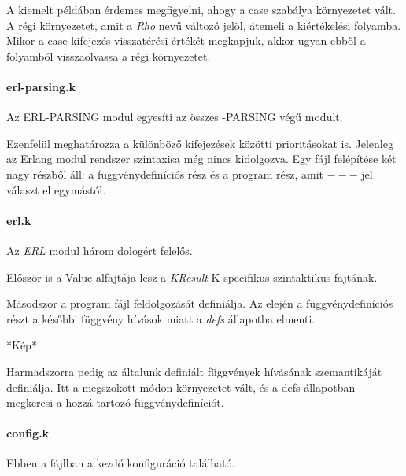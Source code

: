 

A kiemelt példában érdemes megfigyelni, ahogy a case szabálya környezetet vált. A régi környezetet, amit a \textit{Rho} nevű változó jelöl, átemeli a kiértékelési folyamba. Mikor a case kifejezés visszatérési értékét megkapjuk, akkor ugyan ebből a folyamból visszaolvassa a régi környezetet.

\paragraph{erl-parsing.k}

Az ERL-PARSING modul egyesíti az összes -PARSING végű modult.



Ezenfelül meghatározza a különböző kifejezések közötti prioritásokat is. Jelenleg az Erlang modul rendszer szintaxisa még nincs kidolgozva. Egy fájl felépítése két nagy részből áll: a függvénydefiníciós rész és a program rész, amit $---$ jel választ el egymástól.

\paragraph{erl.k}

Az \textit{ERL} modul három dologért felelős.



Először is a Value alfajtája lesz a \textit{KResult} K specifikus szintaktikus fajtának.



Másodszor a program fájl feldolgozását definiálja. Az elején a függvénydefiníciós részt a későbbi függvény hívások miatt a \textit{defs} állapotba elmenti.

*Kép*

Harmadszorra pedig az általunk definiált függvények hívásának szemantikáját definiálja. Itt a megszokott módon környezetet vált, és a defs állapotban megkeresi a hozzá tartozó függvénydefiníciót.


\paragraph{config.k}

Ebben a fájlban a kezdő konfiguráció található.

